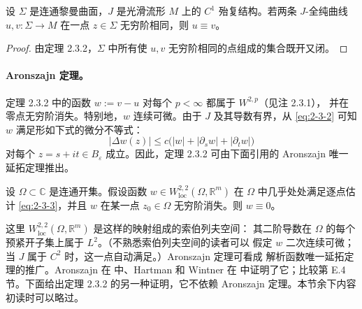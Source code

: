 \begin{corollary}\label{cor:2-3-3}
设 $\Sigma$ 是连通黎曼曲面，$J$ 是光滑流形 $M$ 上的 $C^1$ 殆复结构。若两条
$J$-全纯曲线 $u,v:\Sigma\to M$ 在一点 $z\in\Sigma$ 无穷阶相同，则 $u\equiv v$。
\end{corollary}

\begin{proof}
由定理 2.3.2，$\Sigma$ 中所有使 $u,v$ 无穷阶相同的点组成的集合既开又闭。
\end{proof}

\paragraph{Aronszajn 定理。}
定理 2.3.2 中的函数 $w:=v-u$ 对每个 $p<\infty$ 都属于 $W^{2,p}$（见注 2.3.1），
并在零点无穷阶消失。特别地，$w$ 连续可微。由于 $J$ 及其导数有界，从
\eqref{eq:2-3-2} 可知 $w$ 满足形如下式的微分不等式：
\begin{equation}\label{eq:2-3-3}
  |\Delta w(z)|\le c\bigl(|w|+|\partial_sw|+|\partial_tw|\bigr)
\end{equation}
对每个 $z=s+it\in B_\varepsilon$ 成立。因此，定理 2.3.2 可由下面引用的 Aronszajn
唯一延拓定理推出。

\begin{theorem}[Aronszajn]\label{thm:2-3-4}
设 $\Omega\subset\mathbb C$ 是连通开集。假设函数
$w\in W^{2,2}_{\mathrm{loc}}(\Omega,\mathbb R^m)$ 在 $\Omega$ 中几乎处处满足逐点估计
\eqref{eq:2-3-3}，并且 $w$ 在某一点 $z_0\in\Omega$ 无穷阶消失。则 $w\equiv0$。
\end{theorem}

这里 $W^{2,2}_{\mathrm{loc}}(\Omega,\mathbb R^m)$ 是这样的映射组成的索伯列夫空间：
其二阶导数在 $\Omega$ 的每个预紧开子集上属于 $L^2$。（不熟悉索伯列夫空间的读者可以
假定 $w$ 二次连续可微；当 $J$ 属于 $C^2$ 时，这一点自动满足。）Aronszajn 定理可看成
解析函数唯一延拓定理的推广。Aronszajn 在  中、Hartman 和 Wintner 在
 中证明了它；比较第 E.4 节。下面给出定理 2.3.2 的另一种证明，它不依赖
Aronszajn 定理。本节余下内容初读时可以略过。

